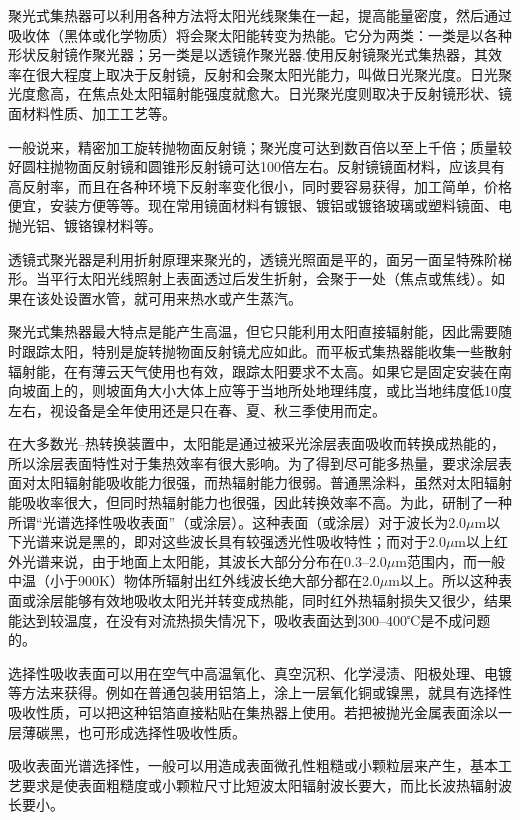 \documentclass{ctexbook}
\begin{document}
聚光式集热器可以利用各种方法将太阳光线聚集在一起，提高能量密度，然后通过吸收体（黑体或化学物质）将会聚太阳能转变为热能。它分为两类：一类是以各种形状反射镜作聚光器；另一类是以透镜作聚光器.使用反射镜聚光式集热器，其效率在很大程度上取决于反射镜，反射和会聚太阳光能力，叫做日光聚光度。日光聚光度愈高，在焦点处太阳辐射能强度就愈大。日光聚光度则取决于反射镜形状、镜面材料性质、加工工艺等。

一般说来，精密加工旋转抛物面反射镜；聚光度可达到数百倍以至上千倍；质量较好圆柱抛物面反射镜和圆锥形反射镜可达100倍左右。反射镜镜面材料，应该具有高反射率，而且在各种环境下反射率变化很小，同时要容易获得，加工简单，价格便宜，安装方便等等。现在常用镜面材料有镀银、镀铝或镀铬玻璃或塑料镜面、电抛光铝、镀铬镍材料等。

透镜式聚光器是利用折射原理来聚光的，透镜光照面是平的，面另一面呈特殊阶梯形。当平行太阳光线照射上表面透过后发生折射，会聚于一处（焦点或焦线）。如果在该处设置水管，就可用来热水或产生蒸汽。

聚光式集热器最大特点是能产生高温，但它只能利用太阳直接辐射能，因此需要随时跟踪太阳，特别是旋转抛物面反射镜尤应如此。而平板式集热器能收集一些散射辐射能，在有薄云天气使用也有效，跟踪太阳要求不太高。如果它是固定安装在南向坡面上的，则坡面角大小大体上应等于当地所处地理纬度，或比当地纬度低10度左右，视设备是全年使用还是只在春、夏、秋三季使用而定。

在大多数光--热转换装置中，太阳能是通过被采光涂层表面吸收而转换成热能的，所以涂层表面特性对于集热效率有很大影响。为了得到尽可能多热量，要求涂层表面对太阳辐射能吸收能力很强，而热辐射能力很弱。普通黑涂料，虽然对太阳辐射能吸收率很大，但同时热辐射能力也很强，因此转换效率不高。为此，研制了一种所谓“光谱选择性吸收表面”（或涂层）。这种表面（或涂层）对于波长为2.0$\mu$m以下光谱来说是黑的，即对这些波长具有较强透光性吸收特性；而对于2.0$\mu$m以上红外光谱来说，由于地面上太阳能，其波长大部分分布在0.3--2.0$\mu$m范围内，而一般中温（小于900K）物体所辐射出红外线波长绝大部分都在2.0$\mu$m以上。所以这种表面或涂层能够有效地吸收太阳光并转变成热能，同时红外热辐射损失又很少，结果能达到较温度，在没有对流热损失情况下，吸收表面达到300--400℃是不成问题的。

选择性吸收表面可以用在空气中高温氧化、真空沉积、化学浸渍、阳极处理、电镀等方法来获得。例如在普通包装用铝箔上，涂上一层氧化铜或镍黑，就具有选择性吸收性质，可以把这种铝箔直接粘贴在集热器上使用。若把被抛光金属表面涂以一层薄碳黑，也可形成选择性吸收性质。

吸收表面光谱选择性，一般可以用造成表面微孔性粗糙或小颗粒层来产生，基本工艺要求是使表面粗糙度或小颗粒尺寸比短波太阳辐射波长要大，而比长波热辐射波长要小。
\end{document}

